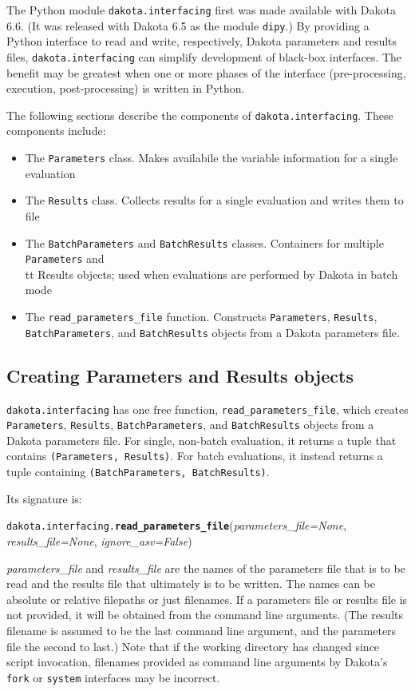 The Python module {\tt dakota.interfacing} first was made available with Dakota 6.6. (It was released with 
Dakota 6.5 as the module {\tt dipy}.) By providing a Python interface to read and write, respectively,
Dakota parameters and results files, {\tt dakota.interfacing} can simplify development of black-box
interfaces. The benefit may be greatest when one or more phases of the interface (pre-processing, execution,
post-processing) is written in Python.

The following sections describe the components of {\tt dakota.interfacing}. These components include:
\begin{itemize}
  \item The {\tt Parameters} class. Makes availabile the variable information for a single evaluation
  \item The {\tt Results} class. Collects results for a single evaluation and writes them to file 
  \item The {\tt BatchParameters} and {\tt BatchResults} classes. Containers for multiple {\tt Parameters} and 
        {\\tt Results} objects; used when evaluations are performed by Dakota in batch mode
  \item The {\tt read\_parameters\_file} function. Constructs {\tt Parameters}, 
        {\tt Results}, {\tt BatchParameters}, and {\tt BatchResults} objects from a Dakota 
        parameters file.
\end{itemize}

\subsection{Creating Parameters and Results objects}

{\tt dakota.interfacing} has one free function, {\tt read\_parameters\_file}, which creates {\tt Parameters}, 
{\tt Results}, {\tt BatchParameters}, and {\tt BatchResults} objects from a Dakota parameters file. For
single, non-batch evaluation, it returns a tuple that contains {\tt (Parameters, Results)}. For batch evaluations,
it instead returns a tuple containing {\tt (BatchParameters, BatchResults)}.

Its signature is:

\label{index:dakota.interfacing.read_parameters_file}\texttt{dakota.interfacing.}\textbf{\texttt{read\_parameters\_file}}({\emph{parameters\_file=None}, \emph{results\_file=None}, \emph{ignore\_asv=False}}){}

\emph{parameters\_file} and \emph{results\_file} are the names of the parameters file that is to be read
and the results file that  ultimately is to be written. The names can be  absolute or relative filepaths or
just filenames. If a parameters file or results file is not provided, it will be obtained from the command 
line arguments. (The results filename is assumed to be the last command line argument, and the parameters 
file the second to last.) Note that if the working directory has changed since script invocation, filenames
provided as command line arguments by Dakota's {\tt fork} or {\tt system} interfaces may be incorrect.

